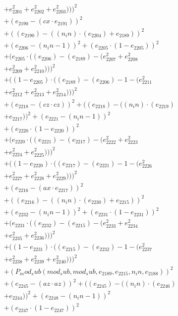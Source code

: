 \documentclass[10pt, a4paper]{article}
\begin{document}
\begin{align*}
& + e_{2201}^{2} + e_{2202}^{2} + e_{2203}^{2})))^{2} \\
& + (e_{2190} - (cx  \cdot  e_{2191}))^{2} \\
& + ((e_{2190}) - ((n_in)  \cdot  (e_{2204}) + e_{2189}))^{2} \\
& + (e_{2206} - (n_in - 1))^{2} + (e_{2205}  \cdot  (1 - e_{2205}))^{2} \\
& + (e_{2205}  \cdot  ((e_{2206}) - (e_{2189}) - (e_{2207}^{2} + e_{2208}^{2} \\
& + e_{2209}^{2} + e_{2210}^{2})))^{2} \\
& + ((1 - e_{2205})  \cdot  ((e_{2189}) - (e_{2206}) - 1 - (e_{2211}^{2} \\
& + e_{2212}^{2} + e_{2213}^{2} + e_{2214}^{2})))^{2} \\
& + (e_{2218} - (cz  \cdot  cz))^{2} + ((e_{2218}) - ((n_in)  \cdot  (e_{2219}) \\
& + e_{2217}))^{2} + (e_{2221} - (n_in - 1))^{2} \\
& + (e_{2220}  \cdot  (1 - e_{2220}))^{2} \\
& + (e_{2220}  \cdot  ((e_{2221}) - (e_{2217}) - (e_{2222}^{2} + e_{2223}^{2} \\
& + e_{2224}^{2} + e_{2225}^{2})))^{2} \\
& + ((1 - e_{2220})  \cdot  ((e_{2217}) - (e_{2221}) - 1 - (e_{2226}^{2} \\
& + e_{2227}^{2} + e_{2228}^{2} + e_{2229}^{2})))^{2} \\
& + (e_{2216} - (ax  \cdot  e_{2217}))^{2} \\
& + ((e_{2216}) - ((n_in)  \cdot  (e_{2230}) + e_{2215}))^{2} \\
& + (e_{2232} - (n_in - 1))^{2} + (e_{2231}  \cdot  (1 - e_{2231}))^{2} \\
& + (e_{2231}  \cdot  ((e_{2232}) - (e_{2215}) - (e_{2233}^{2} + e_{2234}^{2} \\
& + e_{2235}^{2} + e_{2236}^{2})))^{2} \\
& + ((1 - e_{2231})  \cdot  ((e_{2215}) - (e_{2232}) - 1 - (e_{2237}^{2} \\
& + e_{2238}^{2} + e_{2239}^{2} + e_{2240}^{2})))^{2} \\
& + (P_mod_sub(mod_sub, mod_sub, e_{2189}, e_{2215}, n_in, e_{2188}))^{2} \\
& + (e_{2245} - (az  \cdot  az))^{2} + ((e_{2245}) - ((n_in)  \cdot  (e_{2246}) \\
& + e_{2244}))^{2} + (e_{2248} - (n_in - 1))^{2} \\
& + (e_{2247}  \cdot  (1 - e_{2247}))^{2} \\

\end{align*}
\end{document}
